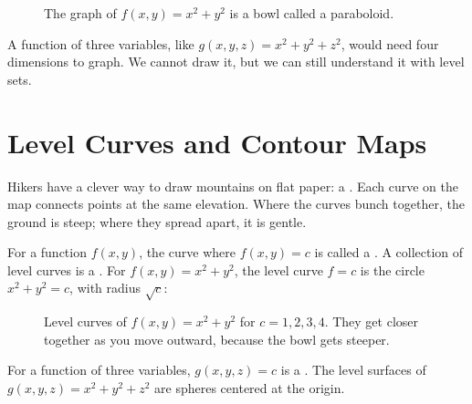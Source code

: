 \begin{figure}[H]
\centering
{}
\caption{The graph of $f(x, y) = x^2 + y^2$ is a bowl called a paraboloid.}
\label{fig:paraboloid}
\end{figure}

A function of three variables, like $g(x, y, z) = x^2 + y^2 + z^2$, would
need four dimensions to graph. We cannot draw it, but we can still
understand it with level sets.

\section{Level Curves and Contour Maps}

Hikers have a clever way to draw mountains on flat paper: a
. Each curve on the map connects points at the
same elevation. Where the curves bunch together, the ground is steep;
where they spread apart, it is gentle.

For a function $f(x, y)$, the curve where $f(x, y) = c$ is called a
. A collection of level curves is a . For $f(x, y) = x^2 + y^2$, the level curve $f = c$ is the circle
$x^2 + y^2 = c$, with radius $\sqrt{c}$:

\begin{figure}[H]
\centering
{}
\caption{Level curves of $f(x, y) = x^2 + y^2$ for $c = 1, 2, 3, 4$. They
get closer together as you move outward, because the bowl gets steeper.}
\label{fig:levelcurves}
\end{figure}

For a function of three variables, $g(x, y, z) = c$ is a . The level surfaces of $g(x, y, z) = x^2 +
y^2 + z^2$ are spheres centered at the origin.

